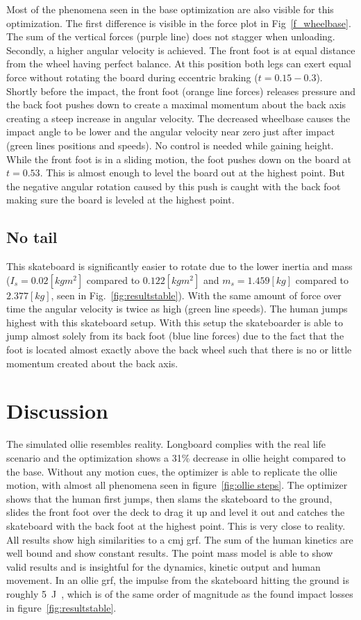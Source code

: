 \documentclass[default,iicol]{sn-jnl}
\begin{document}
Most of the phenomena seen in the base optimization are also visible for this optimization. The first difference is visible in the force plot in Fig~\ref{f_wheelbase}. The sum of the vertical forces (purple line) does not stagger when unloading. Secondly, a higher angular velocity is achieved. The front foot is at equal distance from the wheel having perfect balance. At this position both legs can exert equal force without rotating the board during eccentric braking ($t=0.15 - 0.3$). Shortly before the impact, the front foot (orange line forces) releases pressure and the back foot pushes down to create a maximal momentum about the back axis creating a steep increase in angular velocity. The decreased wheelbase causes the impact angle to be lower and the angular velocity near zero just after impact (green lines positions and speeds). No control is needed while gaining height. While the front foot is in a sliding motion, the foot pushes down on the board at $t=0.53$. This is almost enough to level the board out at the highest point. But the negative angular rotation caused by this push is caught with the back foot making sure the board is leveled at the highest point.



\subsection{No tail}
This skateboard is significantly easier to rotate due to the lower inertia and mass ($I_s = 0.02 [kg m^2]$ compared to $0.122 [kg m^2]$ and $m_s = 1.459 [kg]$ compared to $2.377 [kg]$, seen in Fig.~\ref{fig:resultstable}). With the same amount of force over time the angular velocity is twice as high (green line speeds). The human jumps highest with this skateboard setup. With this setup the skateboarder is able to jump almost solely from its back foot (blue line forces) due to the fact that the foot is located almost exactly above the back wheel such that there is no or little momentum created about the back axis. 

\section{Discussion}
The simulated ollie resembles reality. Longboard complies with the real life scenario and the optimization shows a 31\% decrease in ollie height compared to the base. Without any motion cues, the optimizer is able to replicate the ollie motion, with almost all phenomena seen in figure~\ref{fig:ollie steps}. The optimizer shows that the human first jumps, then slams the skateboard to the ground, slides the front foot over the deck to drag it up and level it out and catches the skateboard with the back foot at the highest point. This is very close to reality. All results show high similarities to a \gls{cmj} \gls{grf}. The sum of the human kinetics are well bound and show constant results. The point mass model is able to show valid results and is insightful for the dynamics, kinetic output and human movement. In an ollie \gls{grf}, the impulse from the skateboard hitting the ground is roughly \SI{5}{\joule}~\cite{determan_kinetics_2006}, which is of the same order of magnitude as the found impact losses in figure~\ref{fig:resultstable}.
\end{document}

